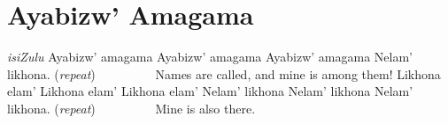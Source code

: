 \starttocol
\chapter{Ayabizw' Amagama}
\nexttocol
\hfill{\it isiZulu}
\stoptocol
\starttocol
\startlines
A{\sc yabizw'} amagama
Ayabizw' amagama
Ayabizw' amagama
Nelam' likhona.     \hfill     ({\it repeat})~~~~~~~~~\hfill
\stoplines
\nexttocol
Names are called, and mine is among them!
\stoptocol
\starttocol
\startlines
Likhona elam'
Likhona elam'
Likhona elam'
Nelam' likhona
Nelam' likhona
Nelam' likhona.        \hfill     ({\it repeat})~~~~~~~~~\hfill
\stoplines
\nexttocol
Mine is also there.
\stoptocol

